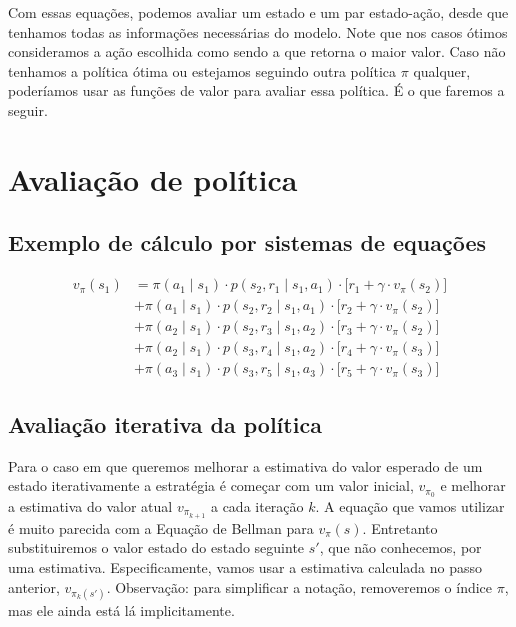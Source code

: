 \documentclass{article}
\begin{document}
            Com essas equações, podemos avaliar um estado e um par estado-ação, desde que tenhamos todas as informações necessárias do modelo. Note que nos casos ótimos consideramos a ação escolhida como sendo a que retorna o maior valor. Caso não tenhamos a política ótima ou estejamos seguindo outra política $\pi$ qualquer, poderíamos usar as funções de valor para avaliar essa política. É o que faremos a seguir.
            
    \section{Avaliação de política}
    
        \subsection{Exemplo de cálculo por sistemas de equações}
        
            \begin{equation}
                \begin{split}
                    v_\pi(s_1) &= \pi(a_1 \mid s_1) \cdot p(s_2, r_1 \mid s_1, a_1) \cdot \Big[ r_1 + \gamma \cdot v_\pi(s_2) \Big] \\
                               &+ \pi(a_1 \mid s_1) \cdot p(s_2, r_2 \mid s_1, a_1) \cdot \Big[ r_2 + \gamma \cdot v_\pi(s_2) \Big] \\
                               &+ \pi(a_2 \mid s_1) \cdot p(s_2, r_3 \mid s_1, a_2) \cdot \Big[ r_3 + \gamma \cdot v_\pi(s_2) \Big] \\
                               &+ \pi(a_2 \mid s_1) \cdot p(s_3, r_4 \mid s_1, a_2) \cdot \Big[ r_4 + \gamma \cdot v_\pi(s_3) \Big] \\
                               &+ \pi(a_3 \mid s_1) \cdot p(s_3, r_5 \mid s_1, a_3) \cdot \Big[ r_5 + \gamma \cdot v_\pi(s_3) \Big]
                \end{split}
            \end{equation}
        
        \subsection{Avaliação iterativa da política}
        
            Para o caso em que queremos melhorar a estimativa do valor esperado de um estado iterativamente a estratégia é começar com um valor inicial, $v_{\pi_{0}}$ e melhorar a estimativa do valor atual $v_{\pi_{k+1}}$ a cada iteração $k$.
            A equação que vamos utilizar é muito parecida com a Equação de Bellman para $v_{\pi}(s)$. 
            Entretanto substituiremos o valor estado do estado seguinte $s'$, que não conhecemos, por uma estimativa.
            Especificamente, vamos usar a estimativa calculada no passo anterior, $v_{\pi_{k}(s')}$.
            Observação: para simplificar a notação, removeremos o índice $\pi$, mas ele ainda está lá implicitamente.
            
\end{document}
